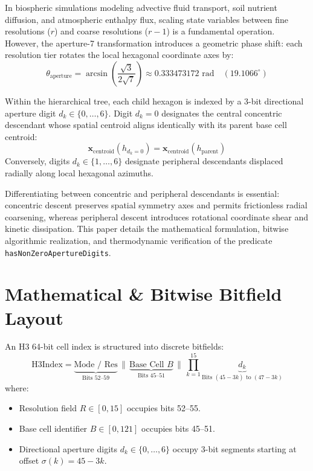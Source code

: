 \documentclass[10pt,journal,compsoc]{IEEEtran}
\begin{document}
In biospheric simulations modeling advective fluid transport, soil nutrient diffusion, and atmospheric enthalpy flux, scaling state variables between fine resolutions ($r$) and coarse resolutions ($r-1$) is a fundamental operation. However, the aperture-7 transformation introduces a geometric phase shift: each resolution tier rotates the local hexagonal coordinate axes by:
\begin{equation}
\theta_{\text{aperture}} = \arcsin\left(\frac{\sqrt{3}}{2\sqrt{7}}\right) \approx 0.333473172 \text{ rad} \quad (19.1066^\circ)
\end{equation}

Within the hierarchical tree, each child hexagon is indexed by a 3-bit directional aperture digit $d_k \in \{0, \dots, 6\}$. Digit $d_k = 0$ designates the central concentric descendant whose spatial centroid aligns identically with its parent base cell centroid:
\begin{equation}
\mathbf{x}_{\text{centroid}}(h_{d_k = 0}) = \mathbf{x}_{\text{centroid}}(h_{\text{parent}})
\end{equation}
Conversely, digits $d_k \in \{1, \dots, 6\}$ designate peripheral descendants displaced radially along local hexagonal azimuths. 

Differentiating between concentric and peripheral descendants is essential: concentric descent preserves spatial symmetry axes and permits frictionless radial coarsening, whereas peripheral descent introduces rotational coordinate shear and kinetic dissipation. This paper details the mathematical formulation, bitwise algorithmic realization, and thermodynamic verification of the predicate \texttt{hasNonZeroApertureDigits}.

\section{Mathematical \& Bitwise Bitfield Layout}

An H3 64-bit cell index is structured into discrete bitfields:
\begin{equation}
\text{H3Index} = \underbrace{\text{Mode / Res}}_{\text{Bits 52--59}} \,\|\, \underbrace{\text{Base Cell } B}_{\text{Bits 45--51}} \,\|\, \prod_{k=1}^{15} \underbrace{d_k}_{\text{Bits }(45-3k)\text{ to }(47-3k)}
\end{equation}
where:
\begin{itemize}
    \item Resolution field $R \in [0, 15]$ occupies bits 52--55.
    \item Base cell identifier $B \in [0, 121]$ occupies bits 45--51.
    \item Directional aperture digits $d_k \in \{0, \dots, 6\}$ occupy 3-bit segments starting at offset $\sigma(k) = 45 - 3k$.
\end{itemize}
\end{document}
